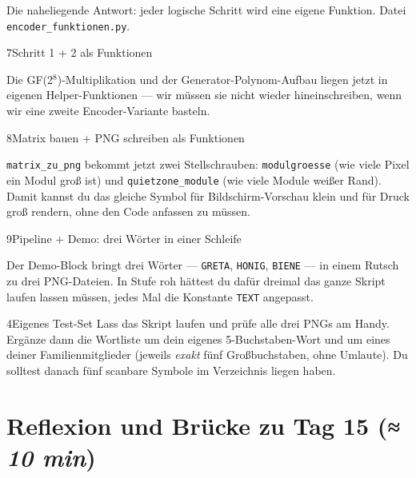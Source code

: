 Die naheliegende Antwort: jeder logische Schritt wird eine eigene
Funktion. Datei \texttt{encoder\_funktionen.py}.

\begin{pythoneinheit}{7}{Schritt 1 + 2 als Funktionen}

Die GF(2$^8$)-Multiplikation und der Generator-Polynom-Aufbau
liegen jetzt in eigenen Helper-Funktionen — wir müssen sie nicht
wieder hineinschreiben, wenn wir eine zweite Encoder-Variante
basteln.
\end{pythoneinheit}

\begin{pythoneinheit}{8}{Matrix bauen + PNG schreiben als Funktionen}

\texttt{matrix\_zu\_png} bekommt jetzt zwei Stellschrauben:
\texttt{modulgroesse} (wie viele Pixel ein Modul groß ist) und
\texttt{quietzone\_module} (wie viele Module weißer Rand). Damit
kannst du das gleiche Symbol für Bildschirm-Vorschau klein und
für Druck groß rendern, ohne den Code anfassen zu müssen.
\end{pythoneinheit}

\begin{pythoneinheit}{9}{Pipeline + Demo: drei Wörter in einer Schleife}

Der Demo-Block bringt drei Wörter — \texttt{GRETA}, \texttt{HONIG},
\texttt{BIENE} — in einem Rutsch zu drei PNG-Dateien. In Stufe roh
hättest du dafür dreimal das ganze Skript laufen lassen müssen,
jedes Mal die Konstante \texttt{TEXT} angepasst.
\end{pythoneinheit}

\begin{bleistiftuebung}{4}{Eigenes Test-Set}
Lass das Skript laufen und prüfe alle drei PNGs am Handy. Ergänze
dann die Wortliste um dein eigenes 5-Buchstaben-Wort und um eines
deiner Familienmitglieder (jeweils \emph{exakt} fünf Großbuchstaben,
ohne Umlaute). Du solltest danach fünf scanbare Symbole im
Verzeichnis liegen haben.
\end{bleistiftuebung}

\section{Reflexion und Brücke zu Tag 15 \normalfont(\textit{≈ 10 min})}


